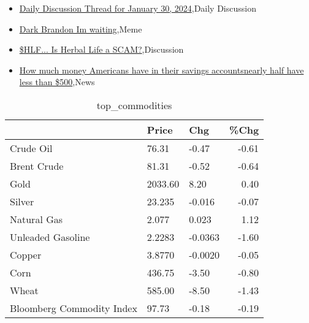 \documentclass{article}%
\begin{document}
%
\begin{itemize}%
\item%
\href{https://reddit.com/r/wallstreetbets/comments/1aelu3e/daily\_discussion\_thread\_for\_january\_30\_2024/}{Daily Discussion Thread for January 30, 2024},Daily Discussion%
\item%
\href{https://reddit.com/r/wallstreetbets/comments/1aelb2r/dark\_brandon\_im\_waiting/}{Dark Brandon Im waiting},Meme%
\item%
\href{https://reddit.com/r/StockMarket/comments/1aed9m7/hlf\_is\_herbal\_life\_a\_scam/}{\$HLF... Is Herbal Life a SCAM?},Discussion%
\item%
\href{https://reddit.com/r/Economics/comments/1aej4ar/how\_much\_money\_americans\_have\_in\_their\_savings/}{How much money Americans have in their savings accountsnearly half have less than \$500},News%
\end{itemize}%


\begin{table}[htbp]%
\caption{top\_commodities}%
\centering%
\begin{adjustbox}{width=1\textwidth}%
\begin{tabular}{lllr}
\toprule
                          &   Price &     Chg &  \%Chg \\
\midrule
               Crude Oil  &   76.31 &   -0.47 & -0.61 \\
             Brent Crude  &   81.31 &   -0.52 & -0.64 \\
                    Gold  & 2033.60 &    8.20 &  0.40 \\
                  Silver  &  23.235 &  -0.016 & -0.07 \\
             Natural Gas  &   2.077 &   0.023 &  1.12 \\
       Unleaded Gasoline  &  2.2283 & -0.0363 & -1.60 \\
                  Copper  &  3.8770 & -0.0020 & -0.05 \\
                    Corn  &  436.75 &   -3.50 & -0.80 \\
                   Wheat  &  585.00 &   -8.50 & -1.43 \\
Bloomberg Commodity Index &   97.73 &   -0.18 & -0.19 \\
\bottomrule
\end{tabular}
%
\end{adjustbox}%
\end{table}

%
\end{document}

